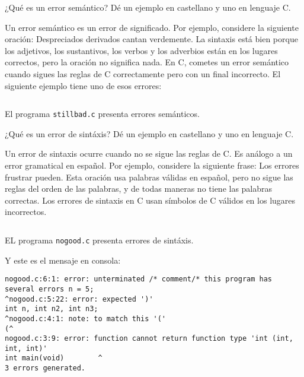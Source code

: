 \documentclass[spanish,addpoints,answers,a4paper]{exam}
\begin{document}
\begin{questions}

\question ¿Qué es un error semántico? Dé un ejemplo en castellano y uno en lenguaje C.

\begin{solution}
Un error semántico es un error de significado. Por ejemplo, considere la siguiente oración: Despreciados derivados cantan verdemente. La sintaxis está bien porque los adjetivos, los sustantivos, los verbos y los adverbios están en los lugares correctos, pero la oración no significa nada. En C, cometes un error semántico cuando sigues las reglas de C correctamente pero con un final incorrecto. El siguiente ejemplo tiene uno de esos errores:

\begin{listing}[H]
\footnotesize
\inputminted{c}{exercise1.c}
\caption{El programa \texttt{stillbad.c} presenta errores semánticos.}
\label{lst:1}
\end{listing}

\end{solution}

\question ¿Qué es un error de sintáxis? Dé un ejemplo en castellano y uno en lenguaje C.

\begin{solution}
Un error de sintaxis ocurre cuando no se sigue las reglas de C. Es análogo a un error gramatical en español. Por ejemplo, considere la siguiente frase: Los errores frustrar pueden. Esta oración usa palabras válidas en español, pero no sigue las reglas del orden de las palabras, y de todas maneras no tiene las palabras correctas. Los errores de sintaxis en C usan símbolos de C válidos en los lugares incorrectos.

\begin{listing}[H]
\footnotesize
\inputminted{c}{exercise2.c}
\caption{EL programa \texttt{nogood.c} presenta errores de sintáxis.}
\label{lst:2}
\end{listing}
Y este es el mensaje en consola:
\

{\footnotesize
\begin{verbatim}
nogood.c:6:1: error: unterminated /* comment/* this program has several errors n = 5;
^nogood.c:5:22: error: expected ')'
int n, int n2, int n3;
^nogood.c:4:1: note: to match this '('
(^
nogood.c:3:9: error: function cannot return function type 'int (int, int, int)'
int main(void)        ^
3 errors generated.
\end{verbatim}
}
\end{solution}


\end{questions}
\end{document}
